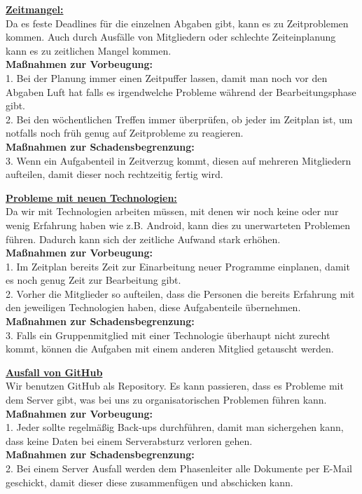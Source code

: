 \documentclass[fontsize=12pt,paper=a4,twoside]{scrartcl}
\begin{document}
\textbf{\underline{Zeitmangel:}}\\
Da es feste Deadlines für die einzelnen Abgaben gibt, kann es zu Zeitproblemen kommen. Auch durch Ausfälle von Mitgliedern oder schlechte Zeiteinplanung kann es zu zeitlichen Mangel kommen.\\
\textbf{Maßnahmen zur Vorbeugung:}\\
1. Bei der Planung immer einen Zeitpuffer lassen, damit man noch vor den Abgaben Luft hat falls es irgendwelche Probleme während der Bearbeitungsphase gibt.\\
2. Bei den wöchentlichen Treffen immer überprüfen, ob jeder im Zeitplan ist, um notfalls noch früh genug auf Zeitprobleme zu reagieren.\\
\textbf{Maßnahmen zur Schadensbegrenzung:}\\
3. Wenn ein Aufgabenteil in Zeitverzug kommt, diesen auf mehreren Mitgliedern aufteilen, damit dieser noch rechtzeitig fertig wird.\\

\bigskip

\textbf{\underline{Probleme mit neuen Technologien:}}\\
Da wir mit Technologien arbeiten müssen, mit denen wir noch keine oder nur wenig Erfahrung haben wie z.B. Android, kann dies zu unerwarteten Problemen führen. Dadurch kann sich der zeitliche Aufwand stark erhöhen.\\
\textbf{Maßnahmen zur Vorbeugung:}\\
1. Im Zeitplan bereits Zeit zur Einarbeitung neuer Programme einplanen, damit es noch genug Zeit zur Bearbeitung gibt.\\
2. Vorher die Mitglieder so aufteilen, dass die Personen die bereits Erfahrung mit den jeweiligen Technologien haben, diese Aufgabenteile übernehmen.\\
\textbf{Maßnahmen zur Schadensbegrenzung:}\\
3. Falls ein Gruppenmitglied mit einer Technologie überhaupt nicht zurecht kommt, können die Aufgaben mit einem anderen Mitglied getauscht werden.\\

\bigskip

\textbf{\underline{Ausfall von GitHub}}\\
Wir benutzen GitHub als Repository. Es kann passieren, dass es Probleme mit dem Server gibt, was bei uns zu organisatorischen Problemen führen kann.
\textbf{Maßnahmen zur Vorbeugung:}\\
1. Jeder sollte regelmäßig Back-ups durchführen, damit man sichergehen kann, dass keine Daten bei einem Serverabsturz verloren gehen.\\
\textbf{Maßnahmen zur Schadensbegrenzung:}\\
2. Bei einem Server Ausfall werden dem Phasenleiter alle Dokumente per E-Mail geschickt, damit dieser diese zusammenfügen und abschicken kann.\\
\end{document}
